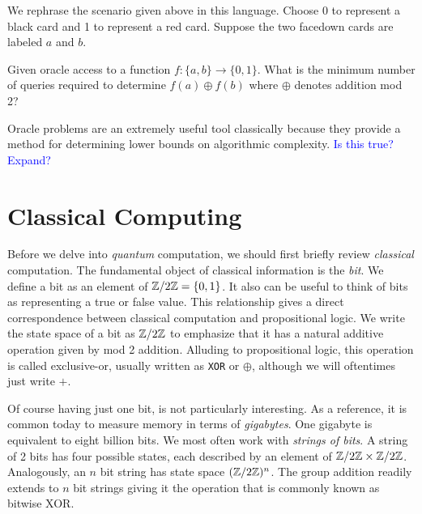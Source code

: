         We rephrase the scenario given above in this language.  Choose 0 to represent a black card and 1 to
        represent a red card. Suppose the two facedown cards are labeled $a$ and $b$.   

        \begin{example} 
            Given oracle access to a function $f: \{a, b\} \rightarrow \{0, 1\}$. What is the minimum number of
            queries required to determine $f(a) \oplus f(b)$ where $\oplus$ denotes addition mod 2?
        \end{example}

        Oracle problems are an extremely useful tool classically because they provide a method for determining
        lower bounds on algorithmic complexity. \textcolor{blue}{Is this true? Expand?}

        \begin{example}
        \end{example}
        

\section{Classical Computing}
        
        Before we delve into \emph{quantum} computation, we should first briefly review \emph{classical} 
        computation. The fundamental object of classical information is the \emph{bit}. We define a bit as an 
        element of $\mathbb{Z}/2\mathbb{Z} = \{0,1\}$. It also can be useful to think of bits as representing a true or false 
        value. This relationship gives a direct correspondence between classical computation and propositional 
        logic. We write the state space of a bit as $\mathbb{Z}/2\mathbb{Z}$ to emphasize that it has a natural additive operation 
        given by mod 2 addition. Alluding to propositional logic, this operation is called exclusive-or, usually 
        written as \texttt{XOR} or $\oplus$, although we will oftentimes just write $+$.

        Of course having just one bit, is not particularly interesting. As a reference, it is common today to 
        measure memory in terms of \emph{gigabytes}. One gigabyte is equivalent to eight billion bits. We most 
        often work with \emph{strings of bits}. A string of 2 bits has four possible states, each described by an 
        element of $\mathbb{Z}/2\mathbb{Z} \times \mathbb{Z}/2\mathbb{Z}$. Analogously, an $n$ bit string has state space $(\mathbb{Z}/2\mathbb{Z})^n$. The group 
        addition readily extends to $n$ bit strings giving it the operation that is commonly known as bitwise XOR.

